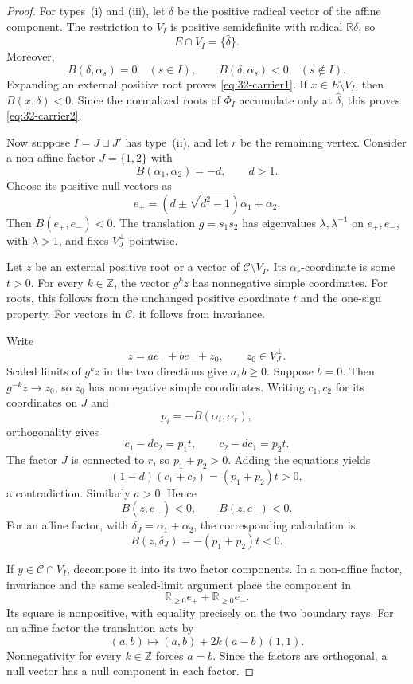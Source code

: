 \documentclass[11pt,reqno]{amsart}
\theoremstyle{plain}
\theoremstyle{definition}
\theoremstyle{remark}
\numberwithin{equation}{section}
\begin{document}
\begin{proof}
For types~\textup{(i)} and \textup{(iii)}, let $\delta$
be the positive radical vector of the affine component.
The restriction to $V_I$ is positive semidefinite with
radical $\mathbb R\delta$, so
\[
    E\cap V_I=\{\widehat\delta\}.
\]
Moreover,
\[
    B(\delta,\alpha_s)=0\quad(s\in I),
    \qquad
    B(\delta,\alpha_s)<0\quad(s\notin I).
\]
Expanding an external positive root proves
\eqref{eq:32-carrier1}.
If $x\in E\setminus V_I$, then $B(x,\delta)<0$.
Since the normalized roots of $\Phi_I$ accumulate only
at $\widehat\delta$, this proves
\eqref{eq:32-carrier2}.

Now suppose $I=J\sqcup J'$ has type~\textup{(ii)},
and let $r$ be the remaining vertex.
Consider a non-affine factor $J=\{1,2\}$ with
\[
    B(\alpha_1,\alpha_2)=-d,\qquad d>1.
\]
Choose its positive null vectors as
\[
    e_\pm=(d\pm\sqrt{d^2-1})\alpha_1+\alpha_2.
\]
Then $B(e_+,e_-)<0$.
The translation $g=s_1s_2$ has eigenvalues
$\lambda,\lambda^{-1}$ on $e_+,e_-$, with $\lambda>1$,
and fixes $V_J^\perp$ pointwise.

Let $z$ be an external positive root or a vector of
$\mathcal C\setminus V_I$.
Its $\alpha_r$-coordinate is some $t>0$.
For every $k\in\mathbb Z$, the vector $g^kz$
has nonnegative simple coordinates.
For roots, this follows from the unchanged positive
coordinate $t$ and the one-sign property.
For vectors in $\mathcal C$, it follows from invariance.

Write
\[
    z=a e_++b e_-+z_0,\qquad z_0\in V_J^\perp.
\]
Scaled limits of $g^kz$ in the two directions give
$a,b\geq0$.
Suppose $b=0$.
Then $g^{-k}z\to z_0$, so $z_0$ has nonnegative
simple coordinates.
Writing $c_1,c_2$ for its coordinates on $J$ and
\[
    p_i=-B(\alpha_i,\alpha_r),
\]
orthogonality gives
\[
    c_1-dc_2=p_1t,\qquad
    c_2-dc_1=p_2t.
\]
The factor $J$ is connected to $r$, so $p_1+p_2>0$.
Adding the equations yields
\[
    (1-d)(c_1+c_2)=(p_1+p_2)t>0,
\]
a contradiction.
Similarly $a>0$. Hence
\[
    B(z,e_+)<0,\qquad B(z,e_-)<0.
\]
For an affine factor, with
$\delta_J=\alpha_1+\alpha_2$, the corresponding calculation is
\[
    B(z,\delta_J)=-(p_1+p_2)t<0.
\]

If $y\in\mathcal C\cap V_I$, decompose it into its two
factor components.
In a non-affine factor, invariance and the same
scaled-limit argument place the component in
\[
    \mathbb R_{\geq0}e_+
    +\mathbb R_{\geq0}e_-.
\]
Its square is nonpositive, with equality precisely
on the two boundary rays.
For an affine factor the translation acts by
\[
    (a,b)\longmapsto(a,b)+2k(a-b)(1,1).
\]
Nonnegativity for every $k\in\mathbb Z$ forces $a=b$.
Since the factors are orthogonal, a null vector has
a null component in each factor.


\end{proof}
\end{document}
